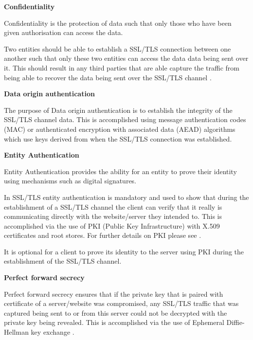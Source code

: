 \documentclass{mscreport}
\begin{document}
\vspace{0.7cm} \noindent
\textbf{Confidentiality}

\noindent
Confidentiality is the protection of data such that only those who have been given authorisation can access the data.

\vspace{0.3cm} \noindent
Two entities should be able to establish a SSL/TLS connection between one another such that only these two entities can access the data data being sent over it. This should result in any third parties that are able capture the traffic from being able to recover the data being sent over the SSL/TLS channel \cite{Martin2017-sx}.

\vspace{0.7cm} \noindent
\textbf{Data origin authentication}

\noindent
The purpose of Data origin authentication is to establish the integrity of the SSL/TLS channel data. This is accomplished using message authentication codes (MAC)  or authenticated encryption with associated data (AEAD) algorithms \cite{Ristic2017-aj} which use keys derived from when the SSL/TLS connection was established.

\vspace{0.7cm} \noindent
\textbf{Entity Authentication}

\noindent
Entity Authentication provides the ability for an entity to prove their identity using mechanisms such as digital signatures.

\vspace{0.3cm} \noindent
In SSL/TLS entity authentication is mandatory and used to show that during the establishment of a SSL/TLS channel the client can verify that it really is communicating directly with the website/server they intended to. This is accomplished via the use of PKI (Public Key Infrastructure) with X.509 certificates and root stores. For further details on PKI please see \cite{Clark2013-sh,Holz2011-yv}.

\vspace{0.3cm} \noindent
It is optional for a client to prove its identity to the server using PKI during the establishment of the SSL/TLS channel.

\vspace{0.7cm} \noindent
\textbf{Perfect forward secrecy}

\noindent
Perfect forward secrecy ensures that if the private key that is paired with certificate of a server/website was compromised, any SSL/TLS traffic that was captured being sent to or from this server could not be decrypted with the private key being revealed. This is accomplished via the use of Ephemeral Diffie-Hellman key exchange \cite{Martin2017-sx}.
\end{document}
